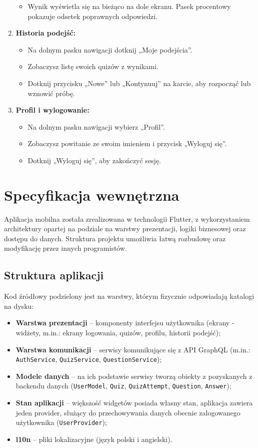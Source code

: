 \documentclass{article}
\begin{document}
\begin{enumerate}
\begin{itemize}
			\item Wynik wyświetla się na bieżąco na dole ekranu. Pasek procentowy pokazuje odsetek poprawnych odpowiedzi.
			\end{itemize}
		\item \textbf{Historia podejść:}
			\begin{itemize}
			\item Na dolnym pasku nawigacji dotknij „Moje podejścia”.
			\item Zobaczysz listę swoich quizów z wynikami.
			\item Dotknij przycisku „Nowe” lub „Kontynuuj” na karcie, aby rozpocząć lub wznowić próbę.
			\end{itemize}
		\item \textbf{Profil i wylogowanie:}
			\begin{itemize}
			\item Na dolnym pasku nawigacji wybierz „Profil”.
			\item Zobaczysz powitanie ze swoim imieniem i przycisk „Wyloguj się”.
			\item Dotknij „Wyloguj się”, aby zakończyć sesję.
			\end{itemize}
		\end{enumerate}
	
	\section{Specyfikacja wewnętrzna}
		Aplikacja mobilna została zrealizowana w technologii Flutter, z wykorzystaniem architektury opartej na podziale na warstwy prezentacji, logiki biznesowej oraz dostępu do danych. Struktura projektu umożliwia łatwą rozbudowę oraz modyfikację przez innych programistów.

		\subsection*{Struktura aplikacji}
			Kod źródłowy podzielony jest na warstwy, którym fizycznie odpowiadają katalogi na dysku:
			\begin{itemize}
				\item \textbf{Warstwa prezentacji} -- komponenty interfejsu użytkownika (ekrany - widżety, m.in.: ekrany logowania, quizów, profilu, historii podejść);
				\item \textbf{Warstwa komunikacji} -- serwisy komunikujące się z API GraphQL (m.in.: \texttt{AuthService}, \texttt{QuizService}, \texttt{QuestionService});
				\item \textbf{Modele danych} -- na ich podstawie serwisy tworzą obiekty z pozyskanych z backendu danych (\texttt{UserModel}, \texttt{Quiz}, \texttt{QuizAttempt}, \texttt{Question}, \texttt{Answer});
				\item \textbf{Stan aplikacji} -- większość widgetów posiada własny stan, aplikacja zawiera jeden provider, służący do przechowywania danych obecnie zalogowanego użytkownika (\texttt{UserProvider});
				\item \textbf{l10n} -- pliki lokalizacyjne (język polski i angielski).
			\end{itemize}
\end{document}
